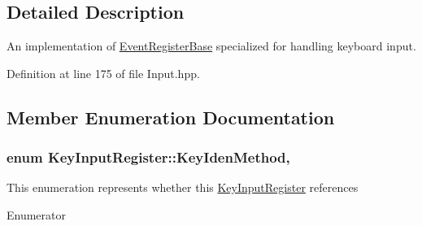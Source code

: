 \subsection{Detailed Description}
An implementation of \hyperlink{class_event_register_base}{Event\-Register\-Base} specialized for handling keyboard input. 

Definition at line 175 of file Input.\-hpp.



\subsection{Member Enumeration Documentation}
\hypertarget{class_key_input_register_a21a7be17fdf11de9736f801ed23b3d5d}{
\subsubsection[{Key\-Iden\-Method}]{\setlength{\rightskip}{0pt plus 5cm}enum {\bf Key\-Input\-Register\-::\-Key\-Iden\-Method}\hspace{0.3cm}{\ttfamily [strong]}, {\ttfamily [protected]}}}\label{class_key_input_register_a21a7be17fdf11de9736f801ed23b3d5d}
This enumeration represents whether this \hyperlink{class_key_input_register}{Key\-Input\-Register} references \begin{Desc}
\item[Enumerator]\par
\begin{description}
\item[{\em 
\hypertarget{class_key_input_register_a21a7be17fdf11de9736f801ed23b3d5dacf1e24867419a579f668008e39431010}{key\-Char}\label{class_key_input_register_a21a7be17fdf11de9736f801ed23b3d5dacf1e24867419a579f668008e39431010}
}]\item[{\em 
\hypertarget{class_key_input_register_a21a7be17fdf11de9736f801ed23b3d5dab96beb1fb95f7fa45257bb48942aef8a}{key\-Code}\label{class_key_input_register_a21a7be17fdf11de9736f801ed23b3d5dab96beb1fb95f7fa45257bb48942aef8a}
}]\item[{\em 
\hypertarget{class_key_input_register_a21a7be17fdf11de9736f801ed23b3d5daf6cb3e816496528d4187db53bc66567f}{both}\label{class_key_input_register_a21a7be17fdf11de9736f801ed23b3d5daf6cb3e816496528d4187db53bc66567f}
}]\end{description}
\end{Desc}


